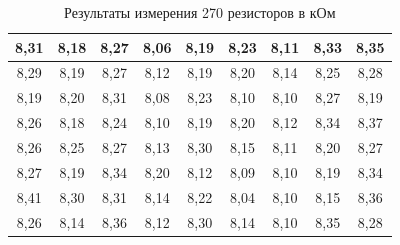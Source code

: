 \documentclass[a4paper,12pt]{article} %
\begin{document}
\begin{table}[]
\begin{tabular}{|c|c|c|c|c|c|c|c|c|}
		8,31 & 8,18 & 8,27 & 8,06 & 8,19 & 8,23 & 8,11 & 8,33 & 8,35 \\ \hline
		8,29 & 8,19 & 8,27 & 8,12 & 8,19 & 8,20 & 8,14 & 8,25 & 8,28 \\ \hline
		8,19 & 8,20 & 8,31 & 8,08 & 8,23 & 8,10 & 8,10 & 8,27 & 8,19 \\ \hline
		8,26 & 8,18 & 8,24 & 8,10 & 8,19 & 8,20 & 8,12 & 8,34 & 8,37 \\ \hline
		8,26 & 8,25 & 8,27 & 8,13 & 8,30 & 8,15 & 8,11 & 8,20 & 8,27 \\ \hline
		8,27 & 8,19 & 8,34 & 8,20 & 8,12 & 8,09 & 8,10 & 8,19 & 8,34 \\ \hline
		8,41 & 8,30 & 8,31 & 8,14 & 8,22 & 8,04 & 8,10 & 8,15 & 8,36 \\ \hline
		8,26 & 8,14 & 8,36 & 8,12 & 8,30 & 8,14 & 8,10 & 8,35 & 8,28 \\ \hline
	\end{tabular} \caption{Результаты измерения 270 резисторов в кОм}\label{rezist}
\end{table}
\end{document}
